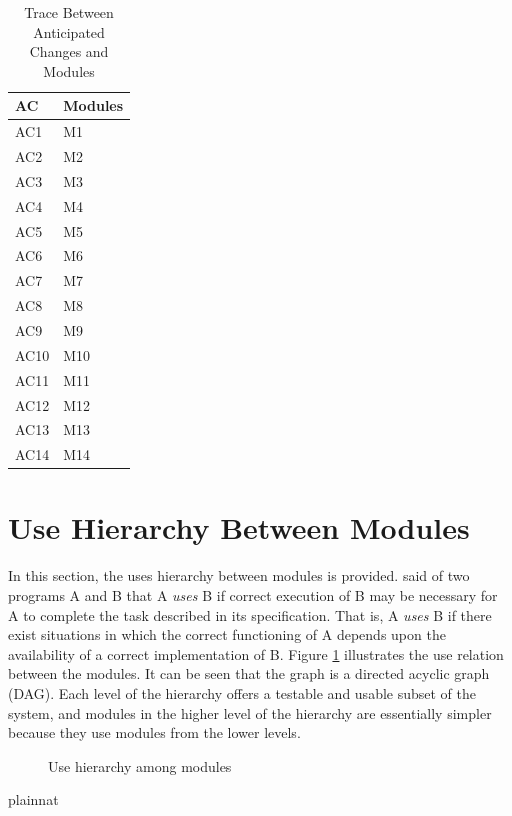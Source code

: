 \documentclass[12pt, titlepage]{article}
\begin{document}
\begin{table}[H]
\centering
\begin{tabular}{p{} p{}}
\toprule
\textbf{AC} & \textbf{Modules}\\
\midrule
AC1&M1\\
AC2&M2\\
AC3&M3\\
AC4&M4\\
AC5&M5\\
AC6&M6\\
AC7&M7\\ 
AC8&M8\\
AC9&M9\\
AC10&M10\\
AC11&M11\\
AC12&M12\\
AC13&M13\\
AC14&M14\\
\bottomrule
\end{tabular}
\caption{Trace Between Anticipated Changes and Modules}
\label{TblACT}
\end{table}

\section{Use Hierarchy Between Modules} \label{SecUse}

In this section, the uses hierarchy between modules is
provided. \citet{Parnas1978} said of two programs A and B that A {\em uses} B if
correct execution of B may be necessary for A to complete the task described in
its specification. That is, A {\em uses} B if there exist situations in which
the correct functioning of A depends upon the availability of a correct
implementation of B.  Figure \ref{FigUH} illustrates the use relation between
the modules. It can be seen that the graph is a directed acyclic graph
(DAG). Each level of the hierarchy offers a testable and usable subset of the
system, and modules in the higher level of the hierarchy are essentially simpler
because they use modules from the lower levels.

\begin{figure}[H]
\centering
\caption{Use hierarchy among modules}
\label{FigUH}
\end{figure}


 {plainnat}


\newpage{}
\end{document}
